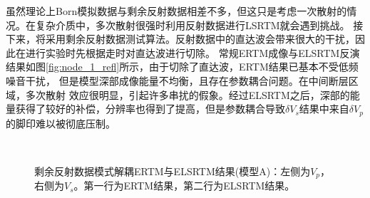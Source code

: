 虽然理论上Born模拟数据与剩余反射数据相差不多，但这只是考虑一次散射的情况。在复杂介质中，多次散射很强时利用反射数据进行LSRTM就会遇到挑战。
接下来，将采用剩余反射数据测试算法。反射数据中的直达波会带来很大的干扰，因此在进行实验时先根据走时对直达波进行切除。
常规ERTM成像与ELSRTM反演结果如图\ref{fig:node_1_refl}所示，由于切除了直达波，ERTM结果已基本不受低频噪音干扰，
但是模型深部成像能量不均衡，且存在参数耦合问题。在中间断层区域，多次散射
效应很明显，引起许多串扰的假象。经过ELSRTM之后，深部的能量获得了较好的补偿，分辨率也得到了提高，但是参数耦合导致$\delta
V_s$结果中来自$\delta V_p$的脚印难以被彻底压制。
\begin{figure}[!hbt]
   \centering
   \\
   \caption{剩余反射数据模式解耦ERTM与ELSRTM结果(模型A)：左侧为$V_p$，右侧为$V_s$。第一行为ERTM结果，第二行为ELSRTM结果。}
   \label{fig:de_1_refl}
\end{figure}

